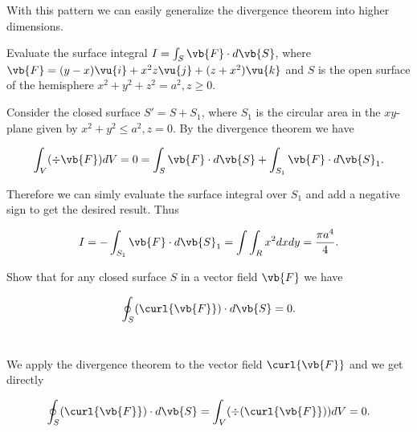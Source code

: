 \documentclass[english,a4paper,12pt]{report}
\begin{document}
With this pattern we can easily generalize the divergence theorem into higher dimensions. 

{Evaluate the surface integral \(I = \int_{S}^{} \vb{F} \cdot d\vb{S}  \), where \(\vb{F} = (y-x)\vu{i} + x^2z \vu{j} + (z+x^2) \vu{k}\) and \(S\) is the open surface of the hemisphere \(x^2 + y^2 + z^2 = a^2, z \ge 0\).}
{Consider the closed surface \(S' = S + S_1 \), where \(S_1 \) is the circular area in the \(xy\)-plane given by \(x^2 + y^2 \le a^2, z=0\). By the divergence theorem we have

\begin{equation}
	\int_{V}^{} (\div{\vb{F} } )dV = 0 = \int_{S}^{} \vb{F} \cdot d\vb{S} + \int_{S_1 }^{} \vb{F} \cdot d\vb{S}_{1} .  
\end{equation}

Therefore we can simly evaluate the surface integral over \(S_1 \) and add a negative sign to get the desired result. Thus

\begin{equation}
	I = - \int_{S_1 }^{} \vb{F} \cdot d\vb{S} _{1} = \int \int_{R}^{} x^2dxdy = \frac{\pi a^4}{4}.   
\end{equation}
} 

{Show that for any closed surface \(S\) in a vector field \(\vb{F} \) we have

\begin{equation}
	\oint_{S}  (\curl{\vb{F} } )\cdot d\vb{S} = 0. 
\end{equation}
~
}
{We apply the divergence theorem to the vector field \(\curl{\vb{F} } \) and we get directly

\begin{equation}
	\oint_{S} (\curl{\vb{F} } )\cdot d\vb{S} = \int_{V}^{} (\div{(\curl{\vb{F} } )} ) dV = 0. 
\end{equation}
~
} 
\end{document}
